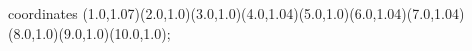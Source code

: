					coordinates { (1.0,1.07)(2.0,1.0)(3.0,1.0)(4.0,1.04)(5.0,1.0)(6.0,1.04)(7.0,1.04)(8.0,1.0)(9.0,1.0)(10.0,1.0)};